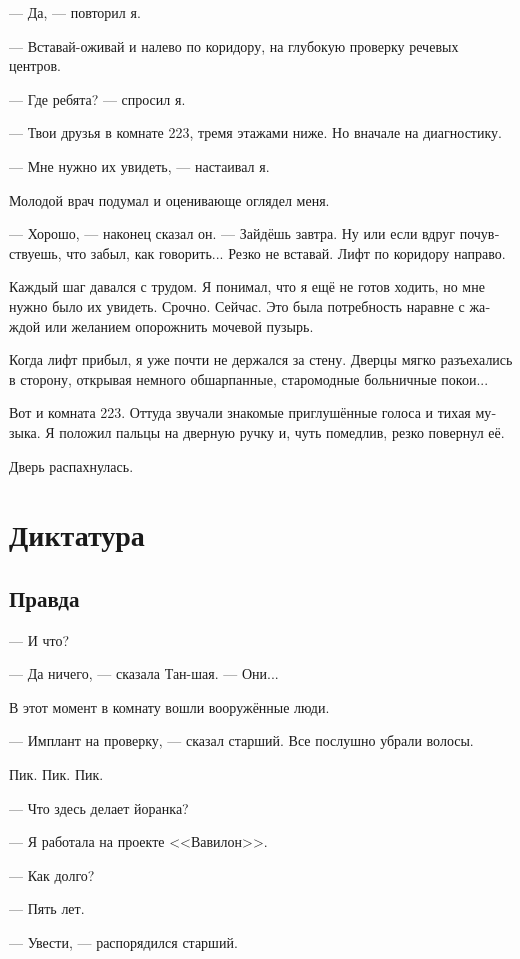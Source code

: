 \documentclass[a4paper,12pt,fleqn]{book}\usepackage{polyglossia}\setdefaultlanguage[babelshorthands=true]{russian}\setotherlanguage{english}\defaultfontfeatures{Ligatures=TeX,Mapping=tex-text}
\begin{document}
--- Да, --- повторил я.

--- Вставай-оживай и налево по коридору, на глубокую проверку речевых центров.

--- Где ребята? --- спросил я.

--- Твои друзья в комнате 223, тремя этажами ниже.
Но вначале на диагностику.

--- Мне нужно их увидеть, --- настаивал я.

Молодой врач подумал и оценивающе оглядел меня.

--- Хорошо, --- наконец сказал он.
--- Зайдёшь завтра.
Ну или если вдруг почувствуешь, что забыл, как говорить...
Резко не вставай.
Лифт по коридору направо.

Каждый шаг давался с трудом.
Я понимал, что я ещё не готов ходить, но мне нужно было их увидеть.
Срочно.
Сейчас.
Это была потребность наравне с жаждой или желанием опорожнить мочевой пузырь.

Когда лифт прибыл, я уже почти не держался за стену.
Дверцы мягко разъехались в сторону, открывая немного обшарпанные, старомодные больничные покои...

Вот и комната 223.
Оттуда звучали знакомые приглушённые голоса и тихая музыка.
Я положил пальцы на дверную ручку и, чуть помедлив, резко повернул её.

Дверь распахнулась.

\chapter{Диктатура}

\section{Правда}

--- И что?

--- Да ничего, --- сказала Тан-шая.
--- Они...

В этот момент в комнату вошли вооружённые люди.

--- Имплант на проверку, --- сказал старший.
Все послушно убрали волосы.

Пик.
Пик.
Пик.

--- Что здесь делает йоранка?

--- Я работала на проекте <<Вавилон>>.

--- Как долго?

--- Пять лет.

--- Увести, --- распорядился старший.
\end{document}
